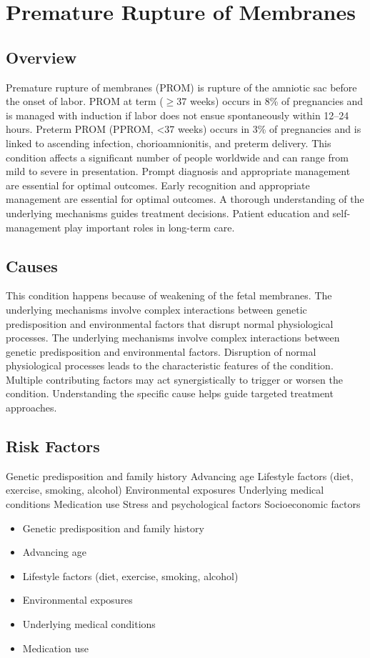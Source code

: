 \chapter{Premature Rupture of Membranes}
\label{sec:Premature Rupture of Membranes}

\section{Overview}
Premature rupture of membranes (PROM) is rupture of the amniotic sac before the onset of labor. PROM at term ($\ge$37 weeks) occurs in 8\% of pregnancies and is managed with induction if labor does not ensue spontaneously within 12--24 hours. Preterm PROM (PPROM, <37 weeks) occurs in 3\% of pregnancies and is linked to ascending infection, chorioamnionitis, and preterm delivery. This condition affects a significant number of people worldwide and can range from mild to severe in presentation. Prompt diagnosis and appropriate management are essential for optimal outcomes. Early recognition and appropriate management are essential for optimal outcomes. A thorough understanding of the underlying mechanisms guides treatment decisions. Patient education and self-management play important roles in long-term care.
\section{Causes}
This condition happens because of weakening of the fetal membranes. The underlying mechanisms involve complex interactions between genetic predisposition and environmental factors that disrupt normal physiological processes. The underlying mechanisms involve complex interactions between genetic predisposition and environmental factors. Disruption of normal physiological processes leads to the characteristic features of the condition. Multiple contributing factors may act synergistically to trigger or worsen the condition. Understanding the specific cause helps guide targeted treatment approaches.
\section{Risk Factors}
Genetic predisposition and family history Advancing age Lifestyle factors (diet, exercise, smoking, alcohol) Environmental exposures Underlying medical conditions Medication use Stress and psychological factors Socioeconomic factors

\begin{itemize}[noitemsep]
  \item Genetic predisposition and family history
  \item Advancing age
  \item Lifestyle factors (diet, exercise, smoking, alcohol)
  \item Environmental exposures
  \item Underlying medical conditions
  \item Medication use
\end{itemize}
